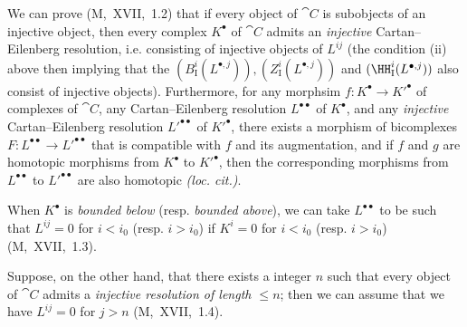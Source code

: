 \begin{env}[11.4.2]
We can prove (M,~XVII,~1.2) that if every object of $\cat{C}$ is subobjects of an injective object, then every complex $K^\bullet$ of $\cat{C}$ admits an \emph{injective} Cartan--Eilenberg resolution, i.e. consisting of injective objects of $L^{ij}$ (the condition (ii) above then implying that the $(B_\mathrm{I}^i(L^{\bullet,j})), (Z_\mathrm{I}^i(L^{\bullet,j}))$ and $(\HH_\mathrm{I}^i(L^{\bullet,j}))$ also consist of injective objects).
Furthermore, for any morphsim $f: K^\bullet \rightarrow K'^\bullet$ of complexes of $\cat{C}$, 
any Cartan--Eilenberg resolution $L^{\bullet\bullet}$ of $K^\bullet$, and any \emph{injective} Cartan--Eilenberg resolution $L'^{\bullet\bullet}$ of $K'^\bullet$, there exists a morphism of bicomplexes $F: L^{\bullet\bullet} \rightarrow L'^{\bullet\bullet}$ that is compatible with $f$ and its augmentation, and if $f$ and $g$ are homotopic morphisms from $K^\bullet$ to $K'^\bullet$, then the corresponding morphisms from $L^{\bullet\bullet}$ to $L'^{\bullet\bullet}$ are also homotopic \emph{(loc. cit.)}.

When $K^{\bullet}$ is \emph{bounded below} (resp. \emph{bounded above}), we can take $L^{\bullet\bullet}$ to be such that $L^{ij}=0$ for $i<i_0$ (resp. $i>i_0$) if $K^i=0$ for $i<i_0$ (resp. $i>i_0$) (M,~XVII,~1.3).

Suppose, on the other hand, that there exists a integer $n$ such that every object of $\cat{C}$ admits a \emph{injective resolution of length $\leq n$};
then we can assume that we have $L^{ij}=0$ for $j>n$ (M,~XVII,~1.4).
\end{env}


